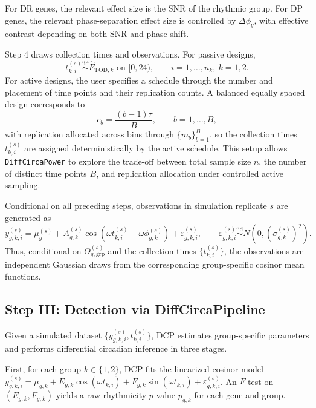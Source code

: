\documentclass{article}
\newcommand{\software}[1]{\texttt{#1}}
\begin{document}
For DR genes, the relevant effect size is the SNR of the rhythmic group. For
DP genes, the relevant phase-separation effect size is controlled by
$\Delta\phi_g$, with effective contrast depending on both SNR and phase shift.

Step 4 draws collection times and observations. For passive designs,
\begin{equation}
t_{k,i}^{(s)}\overset{\mathrm{iid}}{\sim}\hat{F}_{\mathrm{TOD},k}
\text{ on }[0,24),
\qquad i=1,\ldots,n_k,\ k=1,2.
\label{eq:passive_times}
\end{equation}
For active designs, the user specifies a schedule through the number and
placement of time points and their replication counts. A balanced equally
spaced design corresponds to
\begin{equation}
c_b = \frac{(b-1)\tau}{B},\qquad b=1,\ldots,B,
\label{eq:active_bins}
\end{equation}
with replication allocated across bins through $\{m_b\}_{b=1}^B$, so the
collection times $t_{k,i}^{(s)}$ are assigned deterministically by the active
schedule.
This setup allows \software{DiffCircaPower} to explore the trade-off between total
sample size $n$, the number of distinct time points $B$, and replication
allocation under controlled active sampling.

Conditional on all preceding steps, observations in simulation replicate $s$
are generated as
\begin{equation}
y_{g,k,i}^{(s)}
=
\mu_g^{(s)}
+
A_{g,k}^{(s)}\cos(\omega t_{k,i}^{(s)}-\omega\phi_{g,k}^{(s)})
+
\varepsilon_{g,k,i}^{(s)},
\qquad
\varepsilon_{g,k,i}^{(s)}\overset{\mathrm{iid}}{\sim}N(0,(\sigma_{g,k}^{(s)})^2).
\label{eq:obs}
\end{equation}
Thus, conditional on $\Theta_{g,\mathrm{grp}}^{(s)}$ and the collection times
$\{t_{k,i}^{(s)}\}$, the observations are independent Gaussian draws from the
corresponding group-specific cosinor mean functions.

\subsection{Step III: Detection via DiffCircaPipeline}
\label{sec:dcp}

Given a simulated dataset
$\{y_{g,k,i}^{(s)},t_{k,i}^{(s)}\}$, DCP estimates
group-specific parameters and performs differential circadian inference in
three stages.

First, for each group $k\in\{1,2\}$, DCP fits the linearized cosinor model
\(y_{g,k,i}^{(s)}=\mu_{g,k}+E_{g,k}\cos(\omega t_{k,i})+F_{g,k}\sin(\omega t_{k,i})
+\varepsilon_{g,k,i}^{(s)}\).
An $F$-test on $(E_{g,k},F_{g,k})$ yields a raw rhythmicity $p$-value $p_{g,k}$
for each gene and group.
\end{document}
